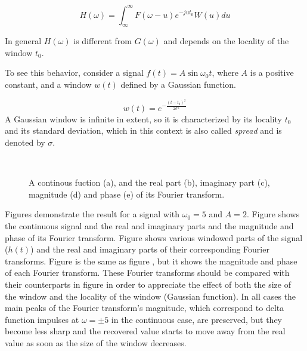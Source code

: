 \begin{equation}\label{eq:short_time_fourier_transform}
    H(\omega) = \int_{\infty}^{\infty}F(\omega - u)e^{-ju t_0}W(u) du
\end{equation}


In general $H(\omega)$ is different from $G(\omega)$ and depends on the locality of the window $t_0$.

To see this behavior, consider a signal $f(t)=A \sin \omega_{0} t$, where $A$ is a positive constant, and a window $w(t)$ defined by a Gaussian function. 

\begin{equation}\label{eq:1d_gaussian_function}
    w(t)=e^{-\frac{(t-t_0)^2}{2\sigma^2}}
\end{equation}
A Gaussian window is infinite in extent, so it is characterized by its locality $t_0$ and its standard deviation, which in this context is also called \textit{spread} and is denoted by $\sigma$. 

\begin{figure}
\centering
{}%
\\%
\hspace{0.33\textwidth}
\caption{A continous fuction (a), and the real part (b), imaginary part (c), magnitude (d) and phase (e) of its Fourier transform.}\label{fig:sin_signal_fourier_comp}
\end{figure}

Figures demonstrate the result for a signal with $\omega_0=5$ and $A=2$. Figure  shows the continuous signal and  the real and imaginary parts and the magnitude and phase of its Fourier transform.  Figure  shows various windowed parts of the signal ($h(t)$) and the real and imaginary parts of their corresponding Fourier transforms.  Figure is the same as figure , but it shows the magnitude and phase of each Fourier transform. These Fourier transforms should be compared with their counterparts in figure  in order to appreciate the effect of both the size of the window and the locality of the window (Gaussian function). In all cases the main peaks of the Fourier transform's magnitude, which correspond to delta function impulses at $\omega=\pm 5$ in the continuous case, are preserved, but they become less sharp and the recovered value starts to move away from the real value as soon as the size of the window decreases. 

